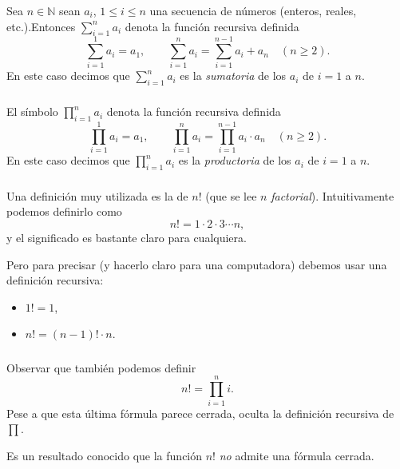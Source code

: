 \documentclass[handout]{beamer} %
\begin{document}
\begin{frame}\frametitle{} 
\begin{definicion} Sea $n \in \mathbb N$ sean $a_i$,  $1 \le i \le n$ una secuencia de números (enteros, reales, etc.).\pause  Entonces $\sum_{i=1}^{n} a_i$  denota la función recursiva definida  \pause 
	$$
	\sum_{i=1}^{1} a_i= a_1, \qquad \sum_{i=1}^{n} a_i = \sum_{i=1}^{n-1} a_i+ a_{n} \quad (n\ge 2).
	$$\pause 
	En  este caso  decimos que  $\displaystyle\sum_{i=1}^{n} a_i$ es la \textit{sumatoria} de los $a_i$ de $i=1$  a $n$. 
\end{definicion}
	
\end{frame}


\begin{frame}\frametitle{} 
\begin{definicion}
	El símbolo $\displaystyle\prod_{i=1}^{n} a_i$ denota la función recursiva definida  \pause 
	$$
	\prod_{i=1}^{1} a_i= a_1, \qquad \prod_{i=1}^{n} a_i = \prod_{i=1}^{n-1} a_i \cdot  a_{n} \quad (n\ge 2).
	$$\pause 
	En  este caso  decimos que  $\displaystyle\prod_{i=1}^{n} a_i$ es la \textit{productoria} de los $a_i$ de $i=1$  a $n$. 
\end{definicion}
	


\end{frame}



\begin{frame}\frametitle{} 
	Una definición muy utilizada es la de  $n!$ (que se lee $n$ {\it factorial}). Intuitivamente podemos definirlo como \pause 
	$$
	n!=1 \cdot 2 \cdot 3 \cdots n,
	$$\pause 
	y el significado es bastante claro para cualquiera.
	
	\medspace \pause 
	
	Pero para precisar (y hacerlo claro para una computadora) debemos usar una definición recursiva:
	\pause 
	\begin{itemize}
		\item $1! = 1$, \pause 
		\item $n! = (n-1)! \cdot n$.
	\end{itemize}
	
	
	
\end{frame}


\begin{frame}\frametitle{} 	
	Observar que también podemos definir 
	\pause 
	$$n! = \prod_{i=1}^{n} i.$$ 
	\pause 
	Pese a que esta última fórmula parece cerrada, oculta la definición recursiva de $\prod$.
	
	\medspace 
	
	\pause 
	Es un resultado conocido  que la función $n!$ \textit{no} admite  una fórmula cerrada. 
	
\end{frame}
\end{document}
